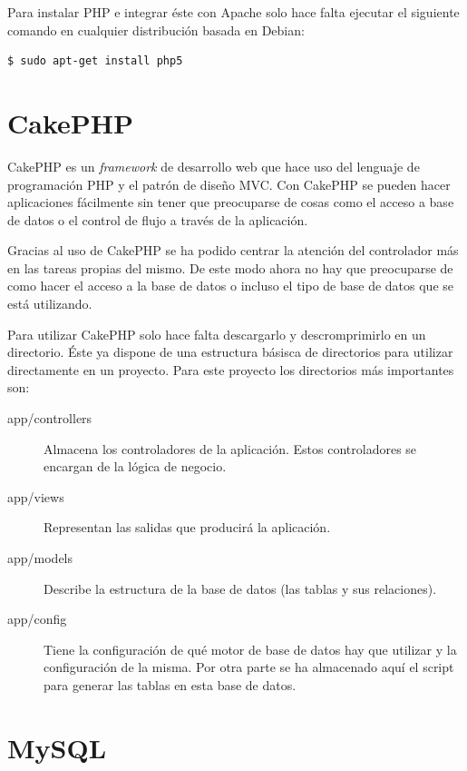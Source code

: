 Para instalar PHP e integrar éste con Apache solo hace falta ejecutar el siguiente comando en cualquier distribución basada en Debian:

\begin{verbatim}
$ sudo apt-get install php5
\end{verbatim}

\section{CakePHP}

CakePHP es un \emph{framework} de desarrollo web que hace uso del lenguaje de programación PHP y el patrón de diseño MVC. Con CakePHP se pueden hacer aplicaciones fácilmente sin tener que preocuparse de cosas como el acceso a base de datos o el control de flujo a través de la aplicación.

Gracias al uso de CakePHP se ha podido centrar la atención del controlador más en las tareas propias del mismo. De este modo ahora no hay que preocuparse de como hacer el acceso a la base de datos o incluso el tipo de base de datos que se está utilizando.

Para utilizar CakePHP solo hace falta descargarlo y descromprimirlo en un directorio. Éste ya dispone de una estructura básisca de directorios para utilizar directamente en un proyecto. Para este proyecto los directorios más importantes son:

\begin{description}
	\item[app/controllers] Almacena los controladores de la aplicación. Estos controladores se encargan de la lógica de negocio.
	
	\item[app/views] Representan las salidas que producirá la aplicación.
	
	\item[app/models] Describe la estructura de la base de datos (las tablas y sus relaciones).

	\item[app/config] Tiene la configuración de qué motor de base de datos hay que utilizar y la configuración de la misma. Por otra parte se ha almacenado aquí el script para generar las tablas en esta base de datos.
\end{description}

\section{MySQL}

